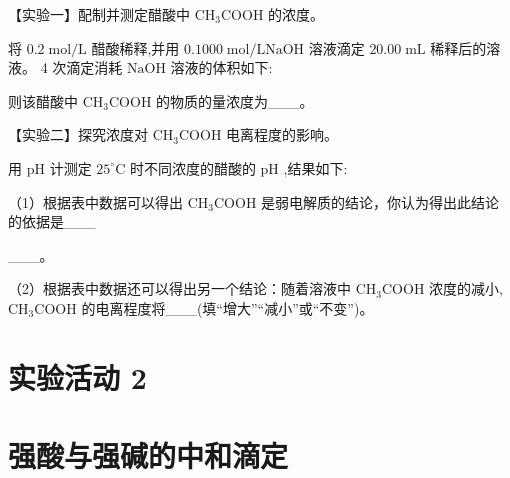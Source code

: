 \documentclass[10pt]{article}
\begin{document}
【实验一】配制并测定醋酸中 \({\mathrm{{CH}}}_{3}\mathrm{{COOH}}\) 的浓度。

将 \({0.2}\mathrm{\;{mol}}/\mathrm{L}\) 醋酸稀释,并用 \({0.1000}\mathrm{\;{mol}}/\mathrm{L}\mathrm{{NaOH}}\) 溶液滴定 \({20.00}\mathrm{\;{mL}}\) 稀释后的溶液。 4 次滴定消耗 \(\mathrm{{NaOH}}\) 溶液的体积如下:

\begin{center}
\end{center}

则该醋酸中 \({\mathrm{{CH}}}_{3}\mathrm{{COOH}}\) 的物质的量浓度为\_\_\_。

【实验二】探究浓度对 \({\mathrm{{CH}}}_{3}\mathrm{{COOH}}\) 电离程度的影响。

用 \(\mathrm{{pH}}\) 计测定 \({25}^{ \circ }\mathrm{C}\) 时不同浓度的醋酸的 \(\mathrm{{pH}}\) ,结果如下:

\begin{center}
\end{center}

（1）根据表中数据可以得出 \({\mathrm{{CH}}}_{3}\mathrm{{COOH}}\) 是弱电解质的结论，你认为得出此结论的依据是\_\_\_

\_\_\_。

（2）根据表中数据还可以得出另一个结论：随着溶液中 \({\mathrm{{CH}}}_{3}\mathrm{{COOH}}\) 浓度的减小, \({\mathrm{{CH}}}_{3}\mathrm{{COOH}}\) 的电离程度将\_\_\_(填“增大”“减小”或“不变”)。

\section*{实验活动 2}

\section*{强酸与强碱的中和滴定}
\end{document}
